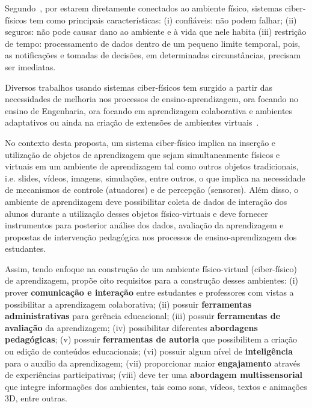 Segundo~\cite{chase:2011}, por estarem diretamente conectados ao ambiente físico, sistemas ciber-físicos tem como principais características: (i) confiáveis: não podem falhar; (ii) seguros: não pode causar dano ao ambiente e à vida que nele habita (iii) restrição de tempo: processamento de dados dentro de um pequeno limite temporal, pois, as notificações e tomadas de decisões, em determinadas circunstâncias, precisam ser imediatas.

Diversos trabalhos usando sistemas ciber-físicos tem surgido a partir das necessidades de melhoria nos processos de ensino-aprendizagem, ora focando no ensino de Engenharia, ora focando em aprendizagem colaborativa e ambientes adaptativos ou ainda na criação de extensões de ambientes virtuais~\citep{Santos:2014,lei:2013,wade:2015,noor:2011,pester:2015,peter:2015}.

No contexto desta proposta, um sistema ciber-físico implica na inserção e utilização de objetos de aprendizagem que sejam simultaneamente físicos e virtuais em um ambiente de aprendizagem tal como outros objetos tradicionais, i.e. slides, vídeos, imagens, simulações, entre outros, o que implica na necessidade de mecanismos de controle (atuadores) e de percepção (sensores). Além disso, o ambiente de aprendizagem deve possibilitar coleta de dados de interação dos alunos durante a utilização desses objetos físico-virtuais e deve fornecer instrumentos para posterior análise dos dados, avaliação da aprendizagem e propostas de intervenção pedagógica nos processos de ensino-aprendizagem dos estudantes.

Assim, tendo enfoque na construção de um ambiente físico-virtual (ciber-físico) de aprendizagem, \cite{santos:2014ambientes} propõe oito requisitos para a construção desses ambientes: (i) prover \textbf{comunicação e interação} entre estudantes e professores com vistas a possibilitar a aprendizagem colaborativa; (ii) possuir \textbf{ferramentas administrativas} para gerência educacional; (iii) possuir \textbf{ferramentas de avaliação} da aprendizagem; (iv) possibilitar diferentes \textbf{abordagens pedagógicas}; (v) possuir \textbf{ferramentas de autoria} que possibilitem a criação ou edição de conteúdos educacionais; (vi) possuir algum nível de \textbf{inteligência} para o auxílio da aprendizagem; (vii) proporcionar maior \textbf{engajamento} através de experiências participativas; (viii) deve ter uma \textbf{abordagem multissensorial} que integre informações dos ambientes, tais como sons, vídeos, textos e animações 3D, entre outras.


